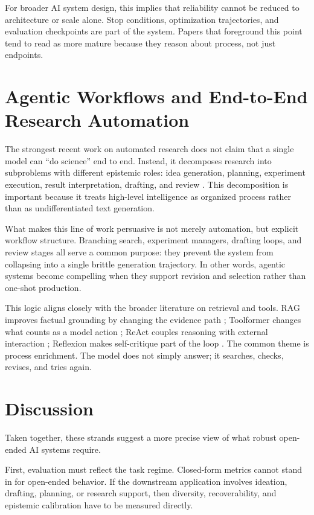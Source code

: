 For broader AI system design, this implies that reliability cannot be reduced to architecture or scale alone. Stop conditions, optimization trajectories, and evaluation checkpoints are part of the system. Papers that foreground this point tend to read as more mature because they reason about process, not just endpoints.

\section{Agentic Workflows and End-to-End Research Automation}
The strongest recent work on automated research does not claim that a single model can ``do science'' end to end. Instead, it decomposes research into subproblems with different epistemic roles: idea generation, planning, experiment execution, result interpretation, drafting, and review \citep{aiscientist2024,aiscientistv2_2025}. This decomposition is important because it treats high-level intelligence as organized process rather than as undifferentiated text generation.

What makes this line of work persuasive is not merely automation, but explicit workflow structure. Branching search, experiment managers, drafting loops, and review stages all serve a common purpose: they prevent the system from collapsing into a single brittle generation trajectory. In other words, agentic systems become compelling when they support revision and selection rather than one-shot production.

This logic aligns closely with the broader literature on retrieval and tools. RAG improves factual grounding by changing the evidence path \citep{lewis2020rag}; Toolformer changes what counts as a model action \citep{schick2023toolformer}; ReAct couples reasoning with external interaction \citep{yao2023react}; Reflexion makes self-critique part of the loop \citep{shinn2023reflexion}. The common theme is process enrichment. The model does not simply answer; it searches, checks, revises, and tries again.

\section{Discussion}
Taken together, these strands suggest a more precise view of what robust open-ended AI systems require.

First, evaluation must reflect the task regime. Closed-form metrics cannot stand in for open-ended behavior. If the downstream application involves ideation, drafting, planning, or research support, then diversity, recoverability, and epistemic calibration have to be measured directly.

